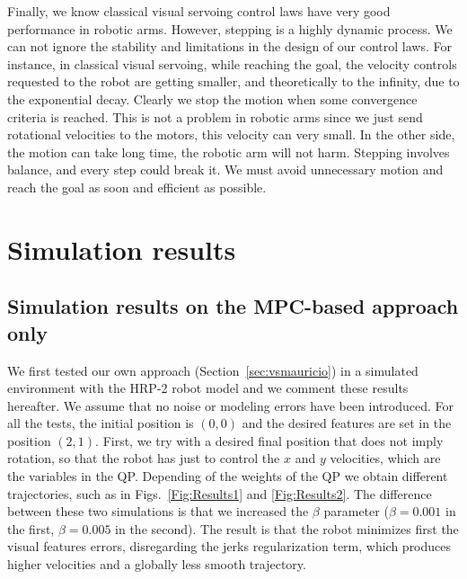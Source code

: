 Finally, we know classical visual servoing control laws have very good performance in robotic arms. However, stepping is a highly dynamic process. We can not ignore the stability and limitations in the design of our control laws. For instance, in classical visual servoing, while reaching the goal, the velocity controls requested to the robot are getting smaller, and theoretically to the infinity, due to the exponential decay. Clearly we stop the motion when some convergence criteria is reached. This is not a problem in robotic arms since we just send rotational velocities to the motors, this velocity can very small. In the other side, the motion can take long time, the robotic arm will not harm. Stepping involves balance, and every step could break it. We must avoid unnecessary motion and reach the goal as soon and efficient as possible.


\section{Simulation results}
\label{sec:results}

\subsection{Simulation results on the MPC-based approach only}

We first tested our own approach (Section~\ref{sec:vsmauricio}) in a simulated environment with the HRP-2 robot model and we comment these results hereafter. We assume that no noise or modeling errors have been introduced. For all the tests, the initial position is $(0,0)$ and the desired features are set in the position $(2,1)$. First, we try with a desired final position that does not imply rotation, so that the robot has just to control the $x$ and $y$ velocities, which are the variables in the QP. Depending of the weights of the QP we obtain different trajectories, such as in Figs.~\ref{Fig:Results1} and \ref{Fig:Results2}. The difference between these two simulations is that we increased the $\beta $ parameter ($\beta=0.001$ in the first, $\beta =0.005$ in the second). The result is that the robot minimizes first the visual features errors, disregarding the jerks regularization term, which produces higher velocities and a globally less smooth trajectory.


